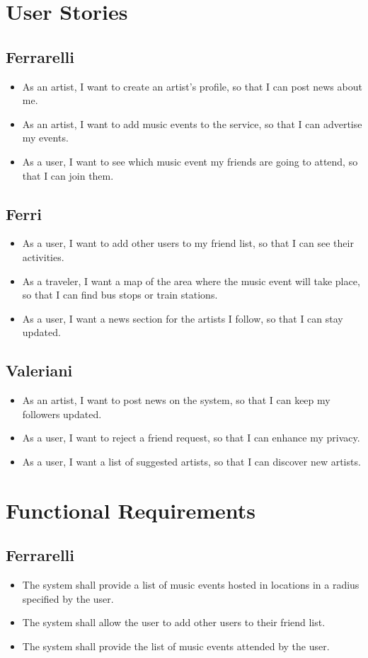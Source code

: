 \documentclass[11pt,a4paper]{article}
\begin{document}
\section{User Stories}
\subsection{Ferrarelli}
\begin{itemize}
\item As an artist, I want to create an artist’s profile, so that I can post news about me.
\item As an artist, I want to add music events to the service, so that I can advertise my events.
\item As a user, I want to see which music event my friends are going to attend, so that I can join them.
\end{itemize}
\subsection{Ferri}
\begin{itemize}
\item As a user, I want to add other users to my friend list, so that I can see their activities.
\item As a traveler, I want a map of the area where the music event will take place, so that I can
find bus stops or train stations.
\item As a user, I want a news section for the artists I follow, so that I can stay updated.
\end{itemize}
\subsection{Valeriani}
\begin{itemize}
\item As an artist, I want to post news on the system, so that I can keep my followers updated.
\item As a user, I want to reject a friend request, so that I can enhance my privacy.
\item As a user, I want a list of suggested artists, so that I can discover new artists.
\end{itemize}
\section{Functional Requirements}
\subsection{Ferrarelli}
\begin{itemize}
\item The system shall provide a list of music events hosted in locations in a radius specified by the user.
\item The system shall allow the user to add other users to their friend list.
\item The system shall provide the list of music events attended by the user.
\end{itemize}
\end{document}
